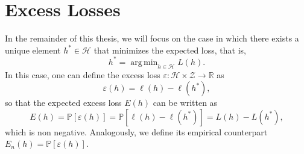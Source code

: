 \documentclass{uvamath}
\newcommand*{\reals}{\mathbb{R}}
\newcommand*{\calH}{\mathcal{H}}
\newcommand*{\calZ}{\mathcal{Z}}
\newcommand*{\bbP}{\mathbb{P}}
\DeclareMathOperator*{\argmin}{arg\,min}
\newtheorem{theorem}{Theorem}[section]
\theoremstyle{remark}
\theoremstyle{definition}
\theoremstyle{definition}
\theoremstyle{definition}
\theoremstyle{definition}
\theoremstyle{definition}
\begin{document}




\section{Excess Losses \label{sect:excess_losses}}

In the remainder of this thesis, we will focus on the case in which
there exists a unique element $h^*\in\calH$ that minimizes the
expected loss, that is,
\begin{equation*}
  h^* = \argmin_{h\in\calH}L(h).
\end{equation*}
In this case, one can define the excess loss
$\varepsilon: \calH \times \calZ\to \reals$ as
\begin{equation*}
  \varepsilon(h) = \ell(h) - \ell(h^*),
\end{equation*}
so that the expected excess loss $E(h)$ can be written as
\begin{equation*}
  E(h)  = \bbP[\varepsilon(h)] =  \bbP[\ell(h) - \ell(h^*)] = L(h) - L(h^*),
\end{equation*}
which is non negative. Analogously, we define its empirical counterpart
$E_n(h) = \bbP[\varepsilon(h)]$.
\end{document}
